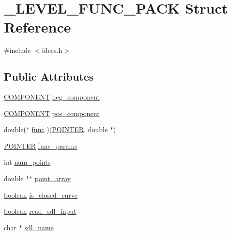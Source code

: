 \hypertarget{struct___l_e_v_e_l___f_u_n_c___p_a_c_k}{}\section{\+\_\+\+L\+E\+V\+E\+L\+\_\+\+F\+U\+N\+C\+\_\+\+P\+A\+CK Struct Reference}
\label{struct___l_e_v_e_l___f_u_n_c___p_a_c_k}


{\ttfamily \#include $<$fdecs.\+h$>$}

\subsection*{Public Attributes}
\begin{DoxyCompactItemize}
\item 
\hyperlink{int_8h_a2bb7be12ca59ea6443c8757df0a7c278}{C\+O\+M\+P\+O\+N\+E\+NT} \hyperlink{struct___l_e_v_e_l___f_u_n_c___p_a_c_k_a07bf625a51b17ce27622d99d3ee61426}{neg\+\_\+component}
\item 
\hyperlink{int_8h_a2bb7be12ca59ea6443c8757df0a7c278}{C\+O\+M\+P\+O\+N\+E\+NT} \hyperlink{struct___l_e_v_e_l___f_u_n_c___p_a_c_k_a965fadcf920a832869e5d9a36fa7140c}{pos\+\_\+component}
\item 
double($\ast$ \hyperlink{struct___l_e_v_e_l___f_u_n_c___p_a_c_k_a1cd8054a1da1e587c0754f57301fd89d}{func} )(\hyperlink{cdecs_8h_ae51a81000f343b8ec43bca1f6a723d7b}{P\+O\+I\+N\+T\+ER}, double $\ast$)
\item 
\hyperlink{cdecs_8h_ae51a81000f343b8ec43bca1f6a723d7b}{P\+O\+I\+N\+T\+ER} \hyperlink{struct___l_e_v_e_l___f_u_n_c___p_a_c_k_a9c3a4c6ff9beff98b2de59cf3bf0f1c5}{func\+\_\+params}
\item 
int \hyperlink{struct___l_e_v_e_l___f_u_n_c___p_a_c_k_a5e80e835f6352cc8c08eb9e7be01fadb}{num\+\_\+points}
\item 
double $\ast$$\ast$ \hyperlink{struct___l_e_v_e_l___f_u_n_c___p_a_c_k_a902a9a2be9df6a2a75c3b3628c83be42}{point\+\_\+array}
\item 
\hyperlink{cdecs_8h_ad048433382a936258fb49e2ec4f148e1}{boolean} \hyperlink{struct___l_e_v_e_l___f_u_n_c___p_a_c_k_a4cbd4382a112c890a285c5e990ea54c8}{is\+\_\+closed\+\_\+curve}
\item 
\hyperlink{cdecs_8h_ad048433382a936258fb49e2ec4f148e1}{boolean} \hyperlink{struct___l_e_v_e_l___f_u_n_c___p_a_c_k_aa6d180a89ab438b3ed869fd805a471e9}{read\+\_\+sdl\+\_\+input}
\item 
char $\ast$ \hyperlink{struct___l_e_v_e_l___f_u_n_c___p_a_c_k_a5b1315dd819c06d3d5a05fd849b5e6d8}{sdl\+\_\+name}
$$
\end{DoxyCompactItemize}
